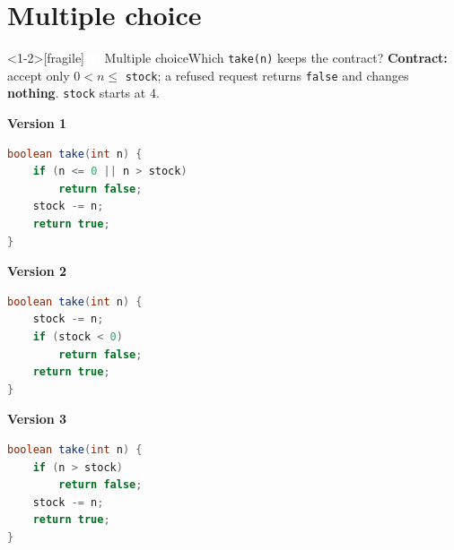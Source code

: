 \documentclass[aspectratio=169]{beamer}
\newcommand{\code}[1]{\texttt{#1}}
\newcommand{\neutrallabel}[1]{\textcolor{bkblue}{\textbf{#1}}}
\newcommand{\qb}[2]{\colorbox{bkblue}{\textcolor{white}{\normalsize\bfseries\sffamily Q#1}}\,{\normalsize\sffamily\textcolor{bkblue!75}{#2}}\enspace}
\begin{document}
\section{Multiple choice}

\begin{frame}<1-2>[fragile]{\qb{2}{Multiple choice}Which \code{take(n)} keeps the contract?}
  \neutrallabel{Contract:} {\small accept only $0 < n \le$ \code{stock}; a refused
  request returns \code{false} and changes \textbf{nothing}. \code{stock} starts at
  4.}\\[0.1em]
  \begin{minipage}[t]{0.315\textwidth}
    \neutrallabel{Version 1}
\begin{lstlisting}[language=Java]
boolean take(int n) {
    if (n <= 0 || n > stock)
        return false;
    stock -= n;
    return true;
}
\end{lstlisting}
  \end{minipage}\hfill
  \begin{minipage}[t]{0.315\textwidth}
    \neutrallabel{Version 2}
\begin{lstlisting}[language=Java]
boolean take(int n) {
    stock -= n;
    if (stock < 0)
        return false;
    return true;
}
\end{lstlisting}
  \end{minipage}\hfill
  \begin{minipage}[t]{0.315\textwidth}
    \neutrallabel{Version 3}
\begin{lstlisting}[language=Java]
boolean take(int n) {
    if (n > stock)
        return false;
    stock -= n;
    return true;
}
\end{lstlisting}
  \end{minipage}


\end{frame}
\end{document}
